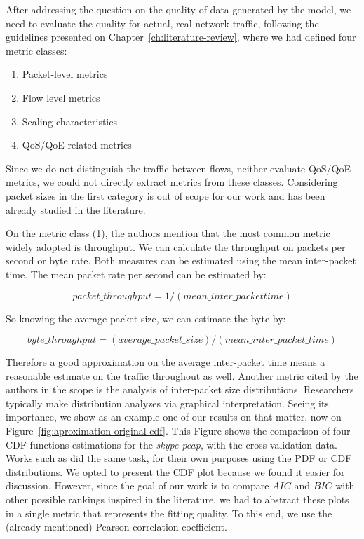 After addressing the question on the quality of data generated by the model, we need to evaluate the quality for actual, real network traffic, following the guidelines presented on Chapter~\ref{ch:literature-review}, where we had defined four metric classes:

\begin{enumerate}
\item  Packet-level metrics
\item  Flow level metrics
\item  Scaling characteristics
\item  QoS/QoE related metrics
\end{enumerate}

Since we do not distinguish the traffic between flows, neither evaluate  QoS/QoE metrics, we could not directly extract metrics from these classes. Considering packet sizes in the first category is out of scope for our work and has been already studied in the literature.

On the metric class (1), the authors mention that the most common metric widely adopted is throughput. We can calculate the throughput on packets per second or byte rate. Both measures can be estimated using the mean inter-packet time.
The mean packet rate per second can be estimated by:

\begin{equation}
\label{eq:pps-mean}
packet\_throughput = 1 / (mean\_inter\_packet time)
\end{equation}

So knowing the average packet size, we can estimate the byte by:

\begin{equation}
\label{eq:th-mean}
byte\_throughput = (average\_packet\_size)/(mean\_inter\_packet\_time)
\end{equation}

Therefore a good approximation on the average inter-packet time means a reasonable estimate on the traffic throughout as well. Another metric cited by the authors in the scope is the analysis of inter-packet size distributions. Researchers typically make distribution analyzes via graphical interpretation. Seeing its importance, we show as an example one of our results on that matter, now on Figure~\ref{fig:aproximation-original-cdf}. This Figure shows the comparison of four  CDF functions estimations for the \textit{skype-pcap}, with the cross-validation data. Works such as \cite{ditg-paper} \cite{sourcesonoff-paper}\cite{do-you-trust}\cite{harpoon-validation}\cite{moongen-paper}\cite{modelling-of-self-similar} did the same task, for their own purposes using the PDF or CDF distributions. We opted to present the CDF plot because we found it easier for discussion. However, since the goal of our work is to compare $AIC$ and $BIC$  with other possible rankings inspired in the literature, we had to abstract these plots in a single metric that represents the fitting quality. To this end, we use the (already mentioned)  Pearson correlation coefficient.

